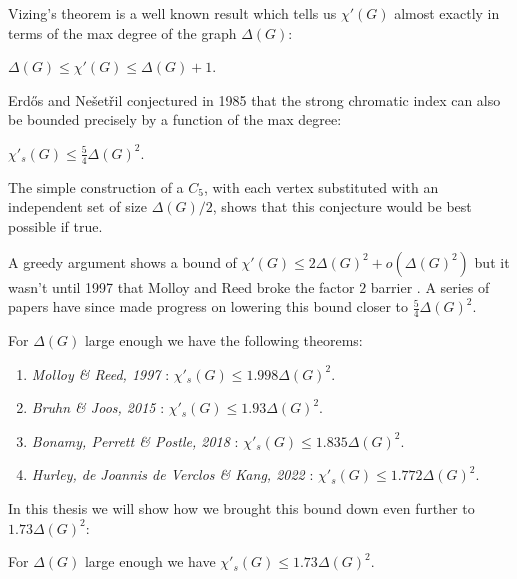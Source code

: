 Vizing's theorem is a well known result which tells us $\chi'(G)$ almost exactly in terms of
the max degree of the graph $\Delta(G)$:
\begin{knowntheorem}
    $\Delta(G) \leq \chi'(G) \leq \Delta(G) + 1$.
\end{knowntheorem}
Erd\H{o}s and Nešetřil conjectured in 1985 that
the strong chromatic index can also be bounded precisely by a function of the max degree:
\begin{knownconjecture}
    \label{conj:intro_erdos_nesetril}
    $\chi'_s(G) \leq \frac{5}{4}\Delta(G)^2$.
\end{knownconjecture}
The simple construction of a $C_5$, with each vertex substituted with an independent set of size $\Delta(G)/2$, shows that this conjecture would be best possible if true.

A greedy argument shows a bound of $\chi'(G) \leq 2\Delta(G)^2 + o(\Delta(G)^2)$ but it wasn't until
1997 that Molloy and Reed broke the factor $2$ barrier \cite{molloyBoundStrongChromatic1997}.
A series of papers have since made progress on lowering this bound closer to $\frac{5}{4}\Delta(G)^2$.

For $\Delta(G)$ large enough we have the following theorems:
\begin{enumerate}
  \item \textit{Molloy \& Reed, 1997} \cite{molloyBoundStrongChromatic1997}:
        $\chi'_s(G) \leq 1.998\Delta(G)^2$.
  \item \textit{Bruhn \& Joos, 2015} \cite{bruhnStrongerBoundStrong2018}:
        $\chi'_s(G) \leq 1.93\Delta(G)^2$.
  \item \textit{Bonamy, Perrett \& Postle, 2018} \cite{bonamyColouringGraphsSparse2018}:
        $\chi'_s(G) \leq 1.835\Delta(G)^2$.
  \item \textit{Hurley, de Joannis de Verclos \& Kang, 2022} \cite{hurleyImprovedProcedureColouring2022}:
        $\chi'_s(G) \leq 1.772\Delta(G)^2$.
\end{enumerate}

In this thesis we will show how we brought this bound down even further to $1.73\Delta(G)^2$:
\begin{knowntheorem}
    For $\Delta(G)$ large enough we have
    $\chi'_s(G) \leq 1.73\Delta(G)^2$.
\end{knowntheorem}

